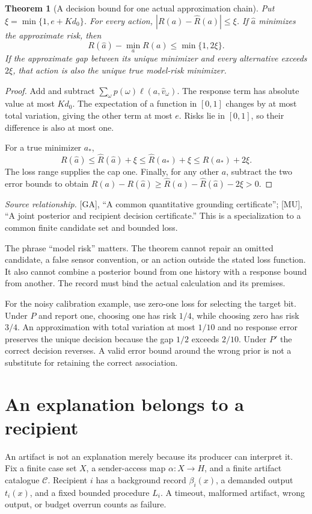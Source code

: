 \documentclass[11pt,oneside,openany]{book}
\newtheorem{theorem}{Theorem}[chapter]
\theoremstyle{definition}\newtheorem{definition}[theorem]{Definition}
\newcommand{\source}[1]{\par{\small\textit{Source relationship.} #1}\par}
\begin{document}
\begin{theorem}[A decision bound for one actual approximation chain]\label{r:risk}
Put $\xi=\min\{1,e+Kd_0\}$. For every action, $|R(a)-\widehat R(a)|\le\xi$. If $\widehat a$ minimizes the approximate risk, then
\[
R(\widehat a)-\min_a R(a)\le\min\{1,2\xi\}.
\]
If the approximate gap between its unique minimizer and every alternative exceeds $2\xi$, that action is also the unique true model-risk minimizer.
\end{theorem}
\begin{proof}
Add and subtract $\sum_\omega p(\omega)\ell(a,\widehat v_\omega)$. The response term has absolute value at most $Kd_0$. The expectation of a function in $[0,1]$ changes by at most total variation, giving the other term at most $e$. Risks lie in $[0,1]$, so their difference is also at most one.

For a true minimizer $a_*$,
\[
R(\widehat a)\le\widehat R(\widehat a)+\xi
\le\widehat R(a_*)+\xi\le R(a_*)+2\xi.
\]
The loss range supplies the cap one. Finally, for any other $a$, subtract the two error bounds to obtain
$R(a)-R(\widehat a)\ge\widehat R(a)-\widehat R(\widehat a)-2\xi>0$.
\end{proof}
\source{[GA], ``A common quantitative grounding certificate''; [MU], ``A joint posterior and recipient decision certificate.'' This is a specialization to a common finite candidate set and bounded loss.}

The phrase ``model risk'' matters. The theorem cannot repair an omitted candidate, a false sensor convention, or an action outside the stated loss function. It also cannot combine a posterior bound from one history with a response bound from another. The record must bind the actual calculation and its premises.

For the noisy calibration example, use zero-one loss for selecting the target bit. Under $P$ and report one, choosing one has risk $1/4$, while choosing zero has risk $3/4$. An approximation with total variation at most $1/10$ and no response error preserves the unique decision because the gap $1/2$ exceeds $2/10$. Under $P'$ the correct decision reverses. A valid error bound around the wrong prior is not a substitute for retaining the correct association.

\section{An explanation belongs to a recipient}
An artifact is not an explanation merely because its producer can interpret it. Fix a finite case set $X$, a sender-access map $\alpha:X\to H$, and a finite artifact catalogue $\mathcal C$. Recipient $i$ has a background record $\beta_i(x)$, a demanded output $t_i(x)$, and a fixed bounded procedure $L_i$. A timeout, malformed artifact, wrong output, or budget overrun counts as failure.
\end{document}
